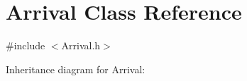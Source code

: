 \hypertarget{classArrival}{}\section{Arrival Class Reference}
\label{classArrival}


{\ttfamily \#include $<$Arrival.\+h$>$}



Inheritance diagram for Arrival\+:

